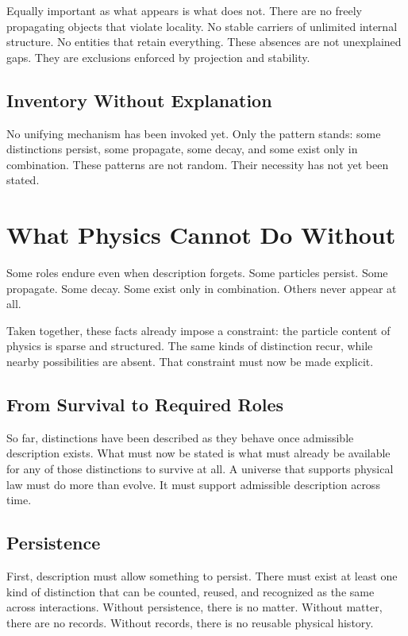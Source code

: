 \documentclass[11pt,twoside,openright]{book}
\begin{document}
Equally important as what appears is what does not. There are no freely propagating objects that violate locality. No stable carriers of unlimited internal structure. No entities that retain everything. These absences are not unexplained gaps. They are exclusions enforced by projection and stability.

\section*{Inventory Without Explanation}

No unifying mechanism has been invoked yet. Only the pattern stands: some distinctions persist, some propagate, some decay, and some exist only in combination. These patterns are not random. Their necessity has not yet been stated.

\chapter{What Physics Cannot Do Without}
Some roles endure even when description forgets.
Some particles persist. Some propagate. Some decay. Some exist only in
combination. Others never appear at all.

Taken together, these facts already impose a constraint: the particle content of physics is sparse and structured. The same kinds of distinction recur, while nearby possibilities are absent. That constraint must now be made explicit.

\section*{From Survival to Required Roles}

So far, distinctions have been described as they behave once admissible description exists. What must now be stated is what must already be available for any of those distinctions to survive at all. A universe that supports physical law must do more than evolve. It must support admissible description across time.

\section*{Persistence}

First, description must allow something to persist. There must exist at least one kind of distinction that can be counted, reused, and recognized as the same across interactions. Without persistence, there is no matter. Without matter, there are no records. Without records, there is no reusable physical history.
\end{document}
